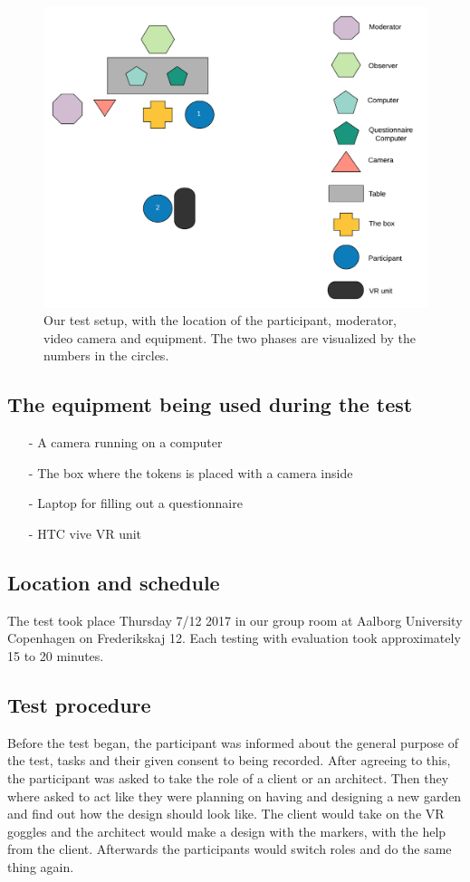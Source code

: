 \begin{figure}[H]
	\centering
	\includegraphics[width=1\linewidth]{figure/Evaluation/Test1.png}
	\caption{Our test setup, with the location of the participant, moderator, video camera and equipment. The two phases are visualized by the numbers in the circles.}
	\label{fig:test1}
\end{figure}

\subsection*{The equipment being used during the test}
\begin{itemize}
	\item[-] A camera running on a computer
	\item[-] The box where the tokens is placed with a camera inside
	\item[-] Laptop for filling out a questionnaire
	\item[-] HTC vive VR unit
\end{itemize}

\subsection*{Location and schedule}
The test took place Thursday 7/12 2017 in our group room at Aalborg University Copenhagen on Frederikskaj 12. Each testing with evaluation took approximately 15 to 20 minutes.

\subsection*{Test procedure}
Before the test began, the participant was informed about the general purpose of the test, tasks and their given consent to being recorded. After agreeing to this, the participant was asked to take the role of a client or an architect. Then they where asked to act like they were planning on having and designing a new garden and find out how the design should look like. The client would take on the VR goggles and the architect would make a design with the markers, with the help from the client. Afterwards the participants would switch roles and do the same thing again.

